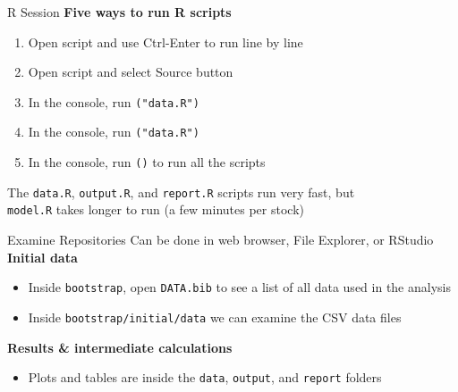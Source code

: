 \documentclass[aspectratio=169]{beamer}
\begin{document}
\begin{frame}{R Session}
  \textbf{\darkgreen Five ways to run R scripts}\\[1.5ex]
  \begin{enumerate}
    \item Open script and use {\darkblue Ctrl-Enter} to run line by line\\[2ex]
    \item Open script and select {\darkblue Source} button\\[2ex]
    \item In the console, run {\tt {}("data.R")}\\[2ex]
    \item In the console, run {\tt {}("data.R")}\\[2ex]
    \item In the console, run {\tt {}()} to run all the
    scripts\\[2ex]
  \end{enumerate}
  \vspace{1ex}
  The {\tt\darkgreen data.R}, {\tt\darkgreen output.R}, and
  {\tt\darkgreen report.R} scripts run very fast, but\\[0.2ex]
  {\tt\orange model.R} takes longer to run (a few minutes per stock)
\end{frame}


\begin{frame}{Examine Repositories}
  Can be done in {\darkgreen web browser}, {\darkgreen File Explorer}, or
  {\darkgreen RStudio}\\[4ex]
  {\bf\darkgreen Initial data}\\[1ex]
  \begin{itemize}
    \item[] Inside {\tt bootstrap}, open {\tt\darkgreen DATA.bib} to see a list
    of all data used in the analysis\\[2ex]
    \item[] Inside {\tt bootstrap/initial/data} we can examine the
    {\darkgreen CSV data files}\\[2ex]
  \end{itemize}
  \vspace{3ex}
  {\bf\darkgreen Results \& intermediate calculations}\\[1ex]
  \begin{itemize}
    \item[] {\darkgreen Plots} and {\darkgreen tables} are inside the
    {\tt data}, {\tt output}, and {\tt report} folders\\[2ex]
  \end{itemize}
\end{frame}
\end{document}
